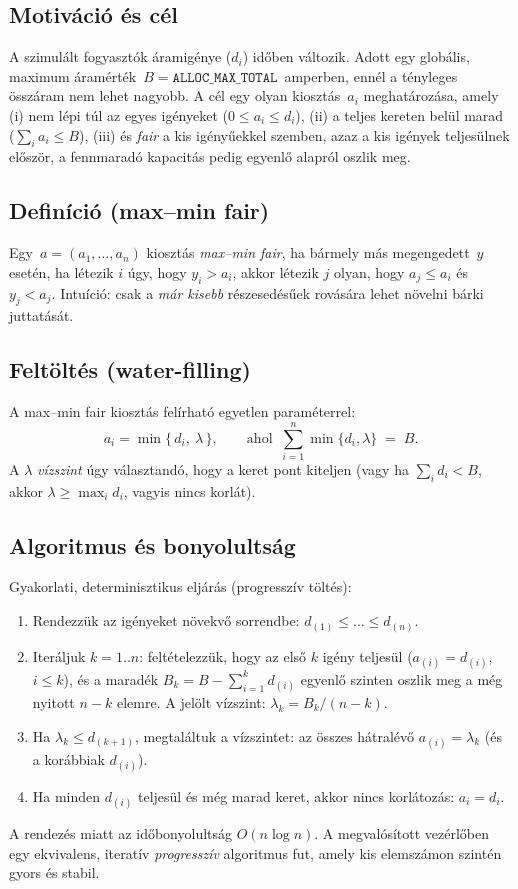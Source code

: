 \subsection{Motiváció és cél}
A szimulált fogyasztók  áramigénye (\(d_i\)) időben változik. 
Adott egy globális, maximum áramérték \(\,B=\texttt{ALLOC\_MAX\_TOTAL}\,\) amperben, 
ennél a tényleges összáram nem lehet nagyobb. A cél egy olyan kiosztás \(\,a_i\) meghatározása, amely
(i) nem lépi túl az egyes igényeket (\(0\le a_i\le d_i\)),
(ii) a teljes kereten belül marad (\(\sum_i a_i \le B\)),
(iii) és \emph{fair} a kis igényűekkel szemben, azaz a kis igények teljesülnek először, a 
fennmaradó kapacitás pedig egyenlő alapról oszlik meg.

\subsection{Definíció (max--min fair)}
Egy \(\,a=(a_1,\dots,a_n)\) kiosztás \emph{max--min fair}, ha bármely más megengedett \(\,y\) esetén, 
ha létezik \(i\) úgy, hogy \(y_i > a_i\), akkor létezik \(j\) olyan, hogy \(a_j \le a_i\) és \(y_j < a_j\). 
Intuíció: csak a \emph{már kisebb} részesedésűek rovására lehet növelni bárki juttatását. \cite{wiki:max-min-fairness}

\subsection{Feltöltés (water-filling)}
A max--min fair kiosztás felírható egyetlen paraméterrel:
\begin{equation}
  a_i = \min\{\,d_i,\ \lambda\,\}, \qquad \text{ahol }\ \sum_{i=1}^n \min\{d_i,\lambda\} \;=\; B.
\end{equation}
A \(\lambda\) \emph{vízszint} úgy választandó, hogy a keret pont kiteljen (vagy ha \( \sum_i d_i < B\), 
akkor \(\lambda\ge \max_i d_i\), vagyis nincs korlát).

\subsection{Algoritmus és bonyolultság}
Gyakorlati, determinisztikus eljárás (progresszív töltés):
\begin{enumerate}
  \item Rendezzük az igényeket növekvő sorrendbe: \(d_{(1)} \le \dots \le d_{(n)}\).
  \item Iteráljuk \(k=1..n\): feltételezzük, hogy az első \(k\) igény teljesül (\(a_{(i)}=d_{(i)}\), \(i\le k\)), 
  és a maradék \(B_k = B - \sum_{i=1}^k d_{(i)}\) egyenlő szinten oszlik meg a még nyitott \(n-k\) elemre. 
  A jelölt vízszint: \(\lambda_k = B_k/(n-k)\).
  \item Ha \(\lambda_k \le d_{(k+1)}\), megtaláltuk a vízszintet: az összes hátralévő \(a_{(i)}=\lambda_k\) 
  (és a korábbiak \(d_{(i)}\)).
  \item Ha minden \(d_{(i)}\) teljesül és még marad keret, akkor nincs korlátozás: \(a_i=d_i\).
\end{enumerate}
A rendezés miatt az időbonyolultság \(O(n\log n)\). A megvalósított vezérlőben egy ekvivalens, 
iteratív \emph{progresszív} algoritmus fut, amely kis elemszámon szintén gyors és stabil.

